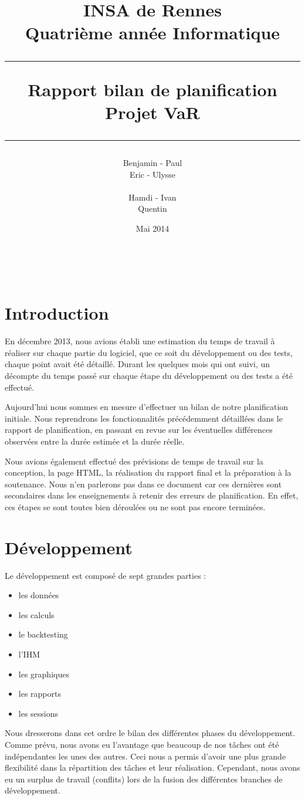 \documentclass[a4paper]{report}
\title{INSA de Rennes \\ Quatrième année Informatique \\ \bigskip \hrule \bigskip Rapport bilan de planification \\ \bigskip Projet VaR \bigskip \hrule}
\author{Benjamin \bsc{Bouguet} - Paul \bsc{Chaignon} \\Eric \bsc{Chauty} - Ulysse \bsc{Goarant} \\ ~~\\
Hamdi \bsc{Raissi} - Ivan \bsc{Le Plumey} \\ Quentin \bsc{Giai Gianetto}}
\date{Mai 2014}
\begin{document}
\maketitle

\thispagestyle{empty}
\newpage

~~
\thispagestyle{empty}
\newpage


\tableofcontents
\newpage


\chapter{Introduction}

En décembre 2013, nous avions établi une estimation du temps de travail à réaliser sur chaque partie du logiciel, que ce soit du développement ou des tests, chaque point avait été détaillé.
Durant les quelques mois qui ont suivi, un décompte du temps passé sur chaque étape du développement ou des tests a été effectué.

Aujourd'hui nous sommes en mesure d'effectuer un bilan de notre planification initiale.
Nous reprendrons les fonctionnalités précédemment détaillées dans le rapport de planification, en passant en revue sur les éventuelles différences observées entre la durée estimée et la durée réelle.

Nous avions également effectué des prévisions de temps de travail sur la conception, la page HTML, la réalisation du rapport final et la préparation à la soutenance.
Nous n'en parlerons pas dans ce document car ces dernières sont secondaires dans les enseignements à retenir des erreurs de planification.
En effet, ces étapes se sont toutes bien déroulées ou ne sont pas encore terminées.


\chapter{Développement}
\noindent Le développement est composé de sept grandes parties :
\begin{itemize}
  \item les données
  \item les calculs
  \item le backtesting
  \item l'IHM
  \item les graphiques
  \item les rapports
  \item les sessions
\end{itemize}

Nous dresserons dans cet ordre le bilan des différentes phases du développement.
Comme prévu, nous avons eu l'avantage que beaucoup de nos tâches ont été indépendantes les unes des autres.
Ceci nous a permis d'avoir une plus grande flexibilité dans la répartition des tâches et leur réalisation.
Cependant, nous avons eu un surplus de travail (conflits) lors de la fusion des différentes branches de développement.
\end{document}
